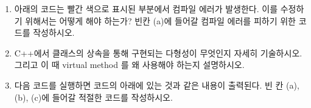 \documentclass{article}
\begin{document}
\begin{enumerate}[itemsep=30pt]
        \item 아래의 코드는 빨간 색으로 표시된 부분에서 컴파일 에러가 발생한다. 이를 수정하기 위해서는 어떻게 해야 하는가? 빈칸 (a)에 들어갈 컴파일 에러를 피하기 위한 코드를 작성하시오.
        \item C++에서 클래스의 상속을 통해 구현되는 다형성이 무엇인지 자세히 기술하시오. 그리고 이 때 virtual method 를 왜 사용해야 하는지 설명하시오.
        \item 다음 코드를 실행하면 코드의 아래에 있는 것과 같은 내용이 출력된다. 빈 칸 (a), (b), (c)에 들어갈 적절한 코드를 작성하시오.
    \end{enumerate}
\end{document}

